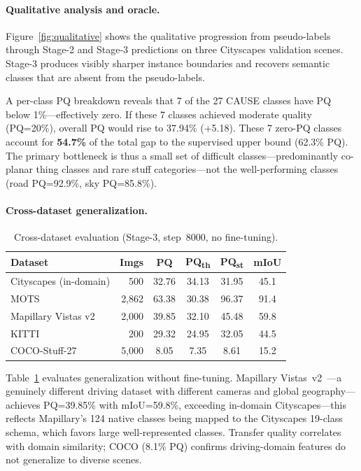 \documentclass{bmvc2k}
\newcommand{\pqt}{PQ\textsubscript{th}\xspace}
\newcommand{\pqs}{PQ\textsubscript{st}\xspace}
\begin{document}
\paragraph{Qualitative analysis and oracle.}
Figure~\ref{fig:qualitative} shows the qualitative progression from pseudo-labels through Stage-2 and Stage-3 predictions on three Cityscapes validation scenes. Stage-3 produces visibly sharper instance boundaries and recovers semantic classes that are absent from the pseudo-labels.

A per-class PQ breakdown reveals that 7 of the 27 CAUSE classes have PQ below 1\%---effectively zero. If these 7 classes achieved moderate quality (PQ=20\%), overall PQ would rise to 37.94\% (+5.18). These 7 zero-PQ classes account for \textbf{54.7\%} of the total gap to the supervised upper bound (62.3\% PQ). The primary bottleneck is thus a small set of difficult classes---predominantly co-planar thing classes and rare stuff categories---not the well-performing classes (road PQ=92.9\%, sky PQ=85.8\%).

\paragraph{Cross-dataset generalization.}

\begin{table}[t]
\centering
\caption{Cross-dataset evaluation (Stage-3, step~8000, no fine-tuning).}
\label{tab:crossdataset}
\small
\begin{tabular}{@{}lrcccc@{}}
\toprule
Dataset & Imgs & PQ & \pqt & \pqs & mIoU \\
\midrule
Cityscapes (in-domain) & 500 & 32.76 & 34.13 & 31.95 & 45.1 \\
MOTS & 2,862 & 63.38 & 30.38 & 96.37 & 91.4 \\
Mapillary Vistas v2 & 2,000 & 39.85 & 32.10 & 45.48 & 59.8 \\
KITTI & 200 & 29.32 & 24.95 & 32.05 & 44.5 \\
COCO-Stuff-27 & 5,000 & 8.05 & 7.35 & 8.61 & 15.2 \\
\bottomrule
\end{tabular}
\end{table}

Table~\ref{tab:crossdataset} evaluates generalization without fine-tuning. Mapillary Vistas~v2~\cite{neuhold2017mapillary}---a genuinely different driving dataset with different cameras and global geography---achieves PQ=39.85\% with mIoU=59.8\%, exceeding in-domain Cityscapes---this reflects Mapillary's 124 native classes being mapped to the Cityscapes 19-class schema, which favors large well-represented classes. Transfer quality correlates with domain similarity; COCO (8.1\% PQ) confirms driving-domain features do not generalize to diverse scenes.
\end{document}
